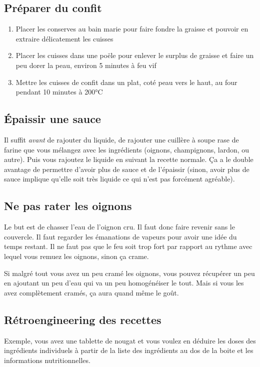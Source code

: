 \documentclass[a4paper,twoside,openright]{report}
\begin{document}
\subsection{Préparer du confit}
\begin{enumerate}
 \item Placer les conserves au bain marie pour faire fondre la graisse et pouvoir en extraire délicatement les cuisses
 \item Placer les cuisses dans une poële pour enlever le surplus de graisse et faire un peu dorer la peau, environ 5 minutes à feu vif
 \item Mettre les cuisses de confit dans un plat, coté peau vers le haut, au four pendant 10 minutes à 200°C
\end{enumerate}



\subsection{Épaissir une sauce}
Il suffit \emph{avant} de rajouter du liquide, de rajouter une cuillère à soupe rase de farine que vous mélangez avec les ingrédients (oignons, champignons, lardon, ou autre). Puis vous rajoutez le liquide en suivant la recette normale. Ça a le double avantage de permettre d'avoir plus de sauce et de l'épaissir (sinon, avoir plus de sauce implique qu'elle soit très liquide ce qui n'est pas forcément agréable).

\subsection{Ne pas rater les oignons}
Le but est de chasser l'eau de l'oignon cru. Il faut donc faire revenir sans le couvercle. Il faut regarder les émanations de vapeurs pour avoir une idée du temps restant. Il ne faut pas que le feu soit trop fort par rapport au rythme avec lequel vous remuez les oignons, sinon ça crame. 

Si malgré tout vous avez un peu cramé les oignons, vous pouvez récupérer un peu en ajoutant un peu d'eau qui va un peu homogénéiser le tout. Mais si vous les avez complètement cramés, ça aura quand même le goût.

\subsection{Rétroengineering des recettes}
Exemple, vous avez une tablette de nougat et vous voulez en déduire les doses des ingrédients individuels à partir de la liste des ingrédients au dos de la boite et les informations nutritionnelles. 
\end{document}
